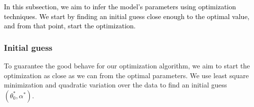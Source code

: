 \documentclass[11pt]{article}
\theoremstyle{definition}
\newcommand{\red}{\textcolor{black}}
\begin{document}
\red{In this subsection, we aim to infer the model's parameters using optimization techniques. We start by finding an initial guess close enough to the optimal value, and from that point, start the optimization.}

\subsubsection{Initial guess}

To guarantee the good behave for our optimization algorithm, we aim to start the optimization as close as we can from the optimal parameters. We use {least square minimization} and {quadratic variation} over the data to find an initial guess $(\theta_0^*,\alpha^*)$.

\begin{itemize}


\end{itemize}
\end{document}
